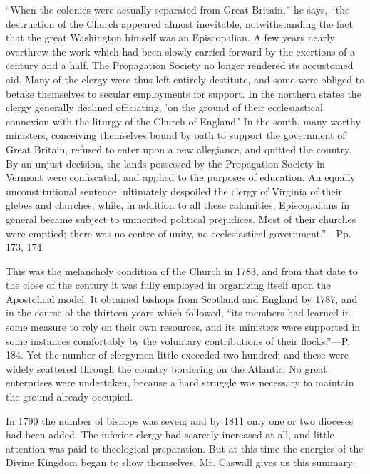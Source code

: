 ``When
the colonies were actually separated from Great Britain,'' he says, ``the
destruction of the Church appeared almost inevitable, notwithstanding
the fact that the great Washington himself was an Episcopalian. A few
years nearly overthrew the work which had been slowly carried forward
by the exertions of a century and a half. The Propagation Society no
longer rendered its accustomed aid. Many of the clergy were thus left
entirely destitute, and some were obliged to betake themselves to
secular employments for support. In the northern states the clergy
generally declined officiating, 'on the ground of their ecclesiastical
connexion with the liturgy of the Church of England.' In the south,
many worthy ministers, conceiving themselves bound by oath to support
the government of Great Britain, refused to enter upon a new
allegiance, and quitted the country. By an unjust decision, the lands
possessed by the Propagation Society in Vermont were confiscated, and
applied to the purposes of education. An equally unconstitutional
sentence, ultimately despoiled the clergy of Virginia of their glebes
and churches; while, in addition to all these calamities,
Episcopalians in general became subject to unmerited political
prejudices. Most of their churches were emptied; there was no centre
of unity, no ecclesiastical government.''—Pp. 173, 174.

This was the melancholy condition of the Church
in 1783, and from that date to the close of the century it was
fully employed in organizing itself upon the Apostolical model. It
obtained bishops from Scotland and England by 1787, and in the course
of the thirteen years which followed, ``its members had learned in some
measure to rely on their own resources, and its ministers were
supported in some instances comfortably by the voluntary contributions
of their flocks.''—P. 184. Yet the number of clergymen little
exceeded two hundred; and these were widely scattered through the
country bordering on the Atlantic. No great enterprises were
undertaken, because a hard struggle was necessary to maintain the
ground already occupied.

In 1790 the number of bishops was seven; and by
1811 only one or two dioceses had been added. The inferior clergy had
scarcely increased at all, and little attention was paid to
theological preparation. But at this time the energies of the Divine
Kingdom began to show themselves. Mr. Caswall gives us this summary:

